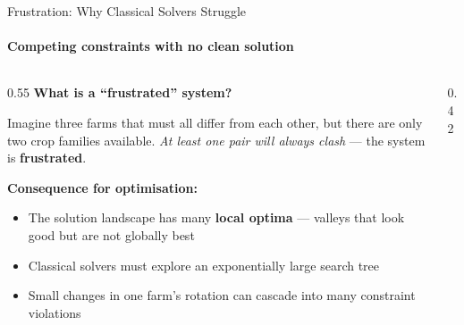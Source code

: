 \documentclass[aspectratio=169,10pt]{beamer}
\begin{document}
\begin{frame}{Frustration: Why Classical Solvers Struggle}
    \framesubtitle{Competing constraints with no clean solution}

    \begin{columns}[T]
        \begin{column}{0.55\textwidth}
            \textbf{What is a ``frustrated'' system?}
            \vspace{0.2cm}

            Imagine three farms that must all differ from each other,
            but there are only two crop families available.
            \emph{At least one pair will always clash} --- the system
            is \textbf{frustrated}.

            \vspace{0.4cm}
            \textbf{Consequence for optimisation:}
            \vspace{0.2cm}
            \begin{itemize}
                \item The solution landscape has many
                      \textbf{local optima} --- valleys that look good
                      but are not globally best
                \item Classical solvers must explore
                      an exponentially large search tree
                \item Small changes in one farm's rotation
                      can cascade into many constraint violations
            \end{itemize}
        \end{column}
        \begin{column}{0.42\textwidth}
            \vspace{0.3cm}


\end{column}
\end{columns}
\end{frame}
\end{document}
